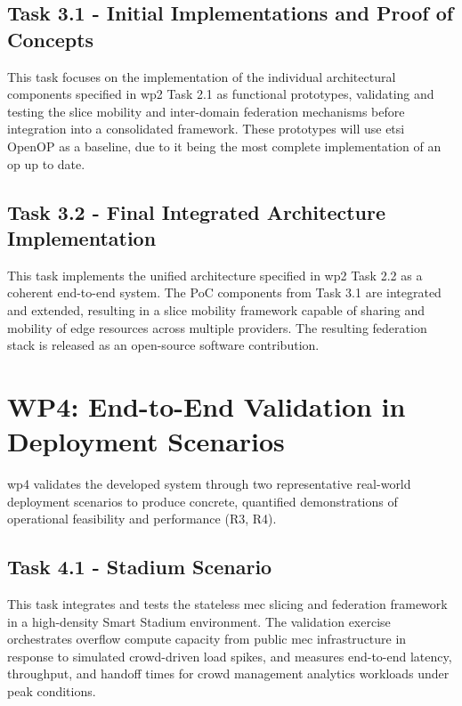 \subsection{Task 3.1 - Initial Implementations and Proof of Concepts}

This task focuses on the implementation of the individual architectural components specified in \ac{wp}2 Task 2.1 as functional prototypes, validating and testing the slice mobility and inter-domain federation mechanisms before integration into a consolidated framework. These prototypes will use \ac{etsi} OpenOP as a baseline, due to it being the most complete implementation of an \ac{op} up to date.

\subsection{Task 3.2 - Final Integrated Architecture Implementation}

This task implements the unified architecture specified in \ac{wp}2 Task 2.2 as a coherent end-to-end system. The PoC components from Task 3.1 are integrated and extended, resulting in a slice mobility framework capable of sharing and mobility of edge resources across multiple providers. The resulting federation stack is released as an open-source software contribution.

\section{WP4: End-to-End Validation in Deployment Scenarios}

\ac{wp}4 validates the developed system through two representative real-world deployment scenarios to produce concrete, quantified demonstrations of operational feasibility and performance (R3, R4).

\subsection{Task 4.1 - Stadium Scenario}

This task integrates and tests the stateless \ac{mec} slicing and federation framework in a high-density Smart Stadium environment. The validation exercise orchestrates overflow compute capacity from public \ac{mec} infrastructure in response to simulated crowd-driven load spikes, and measures end-to-end latency, throughput, and handoff times for crowd management analytics workloads under peak conditions.

